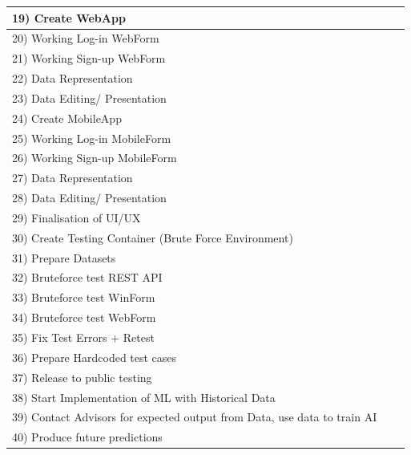 \documentclass[a4paper,11pt]{proc}
\begin{document}
\begin{table}
\begin{tabular}{|lll|}
\hline
19) Create WebApp                                                        &  &  \\
\hline
20) Working Log-in WebForm                                               &  &  \\
\hline
21) Working Sign-up WebForm                                              &  &  \\
\hline
22) Data Representation                                                  &  &  \\
\hline
23) Data Editing/ Presentation                                           &  &  \\
\hline
24) Create MobileApp                                                        &  &  \\
\hline
25) Working Log-in MobileForm                                               &  &  \\
\hline
26) Working Sign-up MobileForm                                              &  &  \\
\hline
27) Data Representation                                                  &  &  \\
\hline
28) Data Editing/ Presentation                                           &  &  \\
\hline
29) Finalisation of UI/UX                                                &  &  \\
\hline
30) Create Testing Container (Brute Force Environment)                   &  &  \\
\hline
31) Prepare Datasets                                                     &  &  \\
\hline
32) Bruteforce test REST API                                             &  &  \\
\hline
33) Bruteforce test WinForm                                              &  &  \\
\hline
34) Bruteforce test WebForm                                              &  &  \\
\hline
35) Fix Test Errors + Retest                                             &  &  \\
\hline
36) Prepare Hardcoded test cases                                         &  &  \\
\hline
37) Release to public testing                                            &  &  \\
\hline
38) Start Implementation of ML with Historical Data                      &  &  \\
\hline
39) Contact Advisors for expected output from Data, use data to train AI &  &  \\
\hline
40) Produce future predictions                                           &  &  \\
\hline
\end{tabular}
\end{table}
\newpage
\end{document}
